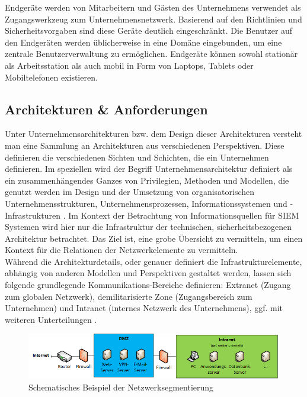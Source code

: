 Endgeräte werden von Mitarbeitern und Gästen des Unternehmens verwendet als Zugangswerkzeug zum Unternehmensnetzwerk. Basierend auf den Richtlinien und Sicherheitsvorgaben sind diese Geräte deutlich eingeschränkt. Die Benutzer auf den Endgeräten werden üblicherweise in eine Domäne eingebunden, um eine zentrale Benutzerverwaltung zu ermöglichen. Endgeräte können sowohl stationär als Arbeitsstation als auch mobil in Form von Laptops, Tablets oder Mobiltelefonen existieren. 


\subsection{Architekturen \&  Anforderungen}
Unter \glqq Unternehmensarchitekturen\grqq{}  bzw. dem Design dieser Architekturen versteht man eine Sammlung an Architekturen aus verschiedenen Perspektiven. Diese definieren die verschiedenen Sichten und Schichten, die ein Unternehmen definieren. Im speziellen wird der Begriff Unternehmensarchitektur definiert als ein zusammenhängendes Ganzes von Privilegien, Methoden und Modellen, die genutzt werden im Design und der Umsetzung von organisatorischen Unternehmensstrukturen, Unternehmensprozessen, Informationssystemen und -Infrastrukturen \citep{Lankhorst2017}. %
Im Kontext der Betrachtung von Informationsquellen für SIEM Systemen wird hier nur die Infrastruktur der  technischen, sicherheitsbezogenen Architektur betrachtet. Das Ziel ist, eine grobe Übersicht zu vermitteln, um einen Kontext für die Relationen der Netzwerkelemente zu vermitteln.\\


Während die Architekturdetails, oder genauer definiert die Infrastrukturelemente, abhängig von anderen Modellen und Perspektiven gestaltet werden, lassen sich folgende grundlegende Kommunikations-Bereiche definieren: Extranet (Zugang zum globalen Netzwerk), demilitarisierte Zone (Zugangsbereich zum Unternehmen) und Intranet (internes Netzwerk des Unternehmens), ggf. mit weiteren Unterteilungen \cite{Stingley2015}. %

\begin{figure}[h]
\centering
\includegraphics[width=150mm]{Zeichnungen/EnterpriseSchema.png}
\caption{Schematisches Beispiel der Netzwerksegmentierung}
\label{fig:EnterpriseSchema}
\end{figure}

